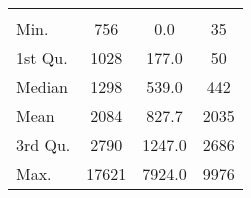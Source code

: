 \begin{tabular}{lS[table-format=5.1]S[table-format=5.1]S[table-format=5.1]}
&  &  &  \\
 Min.    & 756 & 0.0 & 35 \\
 1st Qu. & 1028 & 177.0 & 50 \\
 Median  & 1298 & 539.0 & 442 \\
 Mean    & 2084 & 827.7 & 2035 \\
 3rd Qu. & 2790 & 1247.0 & 2686 \\
 Max.    & 17621 & 7924.0 & 9976 \\
\end{tabular}
